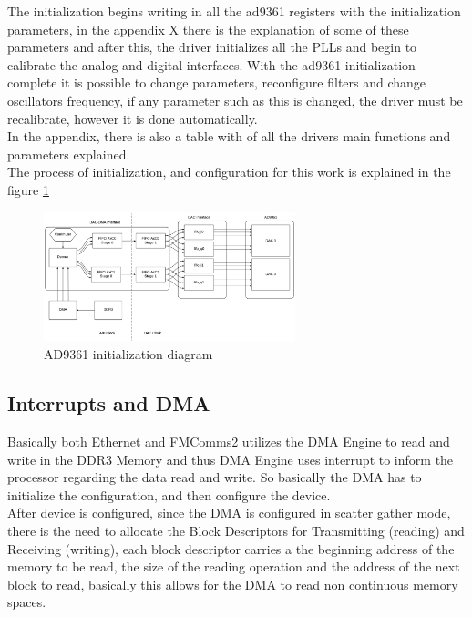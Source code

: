 The initialization begins writing in all the ad9361 registers with the
initialization parameters, in the appendix X there is the explanation of some
of these parameters  and after this, the driver initializes all the PLLs and begin
to calibrate the analog and digital interfaces. With the ad9361 initialization
complete it is possible to change parameters, reconfigure filters and  change
oscillators frequency, if any parameter such as this is changed, the driver
must be recalibrate, however it is done automatically.\\

In the appendix, there is also a table with of all the
drivers main functions and parameters explained.\\



The process of initialization, and configuration for this work is explained in
the figure \ref{fig:ad9361init}


\begin{figure}[htbp]
    \centering
    \includegraphics[width=0.65\textwidth]{./figures/txdata_if}
    \caption{ AD9361 initialization diagram
    \label{fig:ad9361init}}
\end{figure}

\subsection{Interrupts and DMA}

Basically both Ethernet and FMComms2 utilizes the DMA Engine to read and write in
the DDR3 Memory and thus DMA Engine uses interrupt to inform the processor regarding
the data read and write. So basically the DMA has to initialize the configuration,
and then configure the device.\\

After device is configured, since the DMA is configured in scatter gather mode,
there is the need to allocate the Block Descriptors for Transmitting (reading)
and Receiving (writing), each block descriptor carries a the beginning address
of the memory to be read, the size of the reading operation and the address of
the next block to read, basically this allows for the DMA to read non continuous
memory spaces.\\


